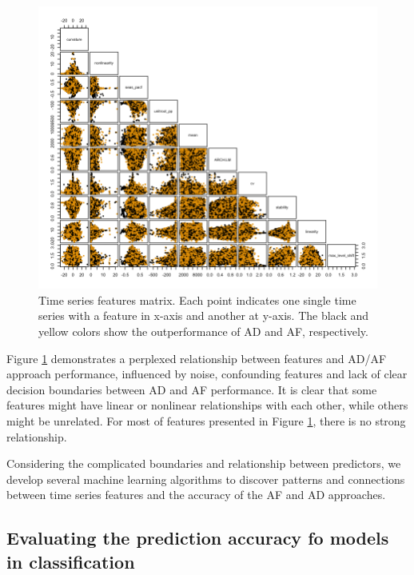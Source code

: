 \documentclass[preprint, 3p,
authoryear]{elsarticle} %
\begin{document}
\begin{figure}[H]

{\centering \includegraphics[width=1\linewidth]{img/pair_plot} 

}

\caption{Time series features matrix. Each point indicates one single time series with a feature in x-axis and another at y-axis. The black and yellow colors show the outperformance of AD and AF, respectively.}\label{fig:featuresmatrix}
\end{figure}

Figure \ref{fig:featuresmatrix} demonstrates a perplexed relationship
between features and AD/AF approach performance, influenced by noise,
confounding features and lack of clear decision boundaries between AD
and AF performance. It is clear that some features might have linear or
nonlinear relationships with each other, while others might be
unrelated. For most of features presented in Figure
\ref{fig:featuresmatrix}, there is no strong relationship.

Considering the complicated boundaries and relationship between
predictors, we develop several machine learning algorithms to discover
patterns and connections between time series features and the accuracy
of the AF and AD approaches.

\hypertarget{evaluating-the-prediction-accuracy-fo-models-in-classification}{%
\subsection{Evaluating the prediction accuracy fo models in
classification}\label{evaluating-the-prediction-accuracy-fo-models-in-classification}}
\end{document}
